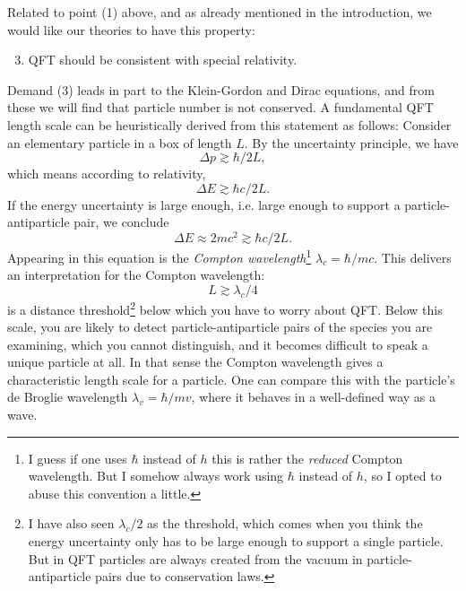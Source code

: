 Related to point (1) above, and as already mentioned in the introduction, we
would like our theories to have this property:
\begin{enumerate}
  \setcounter{enumi}{2}
  \item QFT should be consistent with special relativity.
\end{enumerate}
Demand (3) leads in part to the Klein-Gordon and Dirac equations, and from these
we will find that particle number is not conserved.
A fundamental QFT length scale can be heuristically derived from this statement 
as follows: Consider an elementary particle in a box of length $L$. By the 
uncertainty principle, we have
\begin{equation}
  \Delta p\gtrsim \hbar/2L,
\end{equation}
which means according to relativity,
\begin{equation}
  \Delta E\gtrsim \hbar c/2L.
\end{equation}
If the energy uncertainty is large enough, i.e. large enough to support a
particle-antiparticle pair, we conclude
\begin{equation}
  \Delta E\approx 2mc^2 \gtrsim\hbar c/2L.
\end{equation}
Appearing in this equation is the {\it Compton wavelength}\footnote{I guess if
one uses $\hbar$ instead of $h$ this is rather the {\it reduced} Compton
wavelength. But I somehow always work using $\hbar$ instead of $h$, so I opted
to abuse this convention a little.}
$\lambda_c=\hbar/mc$. This delivers an interpretation for the Compton wavelength:
\begin{equation}
  L \gtrsim \lambda_c/4
\end{equation}
is a distance threshold\footnote{I have also seen $\lambda_c/2$ as the threshold,
which comes when you think the energy uncertainty only has to be large enough to
support a single particle. But in QFT particles are always created from the
vacuum in particle-antiparticle pairs due to conservation laws.} below which 
you have to worry about QFT. Below this scale, you are likely to detect
particle-antiparticle pairs of the species you are examining, which you cannot
distinguish, and it becomes difficult to speak a unique particle at all. In that
sense the Compton wavelength gives a characteristic length scale for a
particle. One can compare this with the particle's de Broglie wavelength
$\lambda_v=\hbar/mv$, where it behaves in a well-defined way as a wave.


